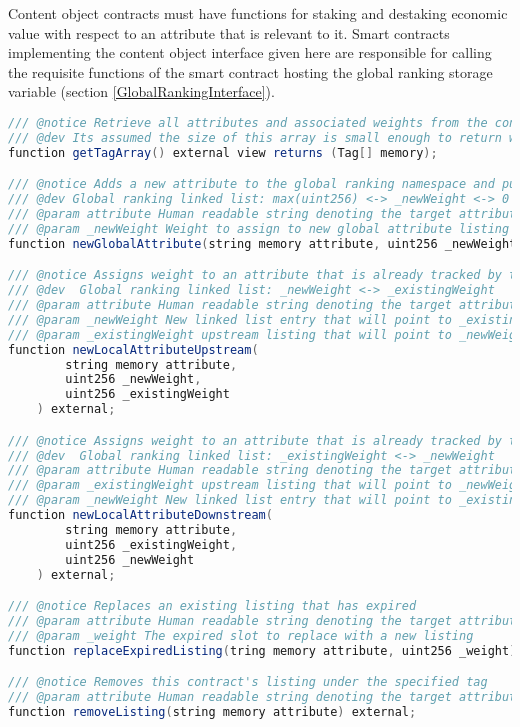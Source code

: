 Content object contracts must have functions for staking and destaking economic value with respect to an attribute that is relevant to it. Smart contracts implementing the content object interface given here are responsible for calling the requisite functions of the smart contract hosting the global ranking storage variable (section \ref{GlobalRankingInterface}). 

\begin{lstlisting}[language=Java, caption=A minimal interface for a content object.]
/// @notice Retrieve all attributes and associated weights from the content object
/// @dev Its assumed the size of this array is small enough to return without pagination
function getTagArray() external view returns (Tag[] memory);

/// @notice Adds a new attribute to the global ranking namespace and pulls stake from the caller account
/// @dev Global ranking linked list: max(uint256) <-> _newWeight <-> 0
/// @param attribute Human readable string denoting the target attribute to stake
/// @param _newWeight Weight to assign to new global attribute listing
function newGlobalAttribute(string memory attribute, uint256 _newWeight) external;

/// @notice Assigns weight to an attribute that is already tracked by the global ranking namespace but hasn't been weighted by this content object yet, pulls stake from the caller account
/// @dev  Global ranking linked list: _newWeight <-> _existingWeight
/// @param attribute Human readable string denoting the target attribute to stake
/// @param _newWeight New linked list entry that will point to _existingWeight listing
/// @param _existingWeight upstream listing that will point to _newWeight
function newLocalAttributeUpstream(
        string memory attribute, 
        uint256 _newWeight, 
        uint256 _existingWeight
    ) external;

/// @notice Assigns weight to an attribute that is already tracked by the global ranking namespace but hasn't been weighted by this content object yet, pulls stake from the caller account
/// @dev  Global ranking linked list: _existingWeight <-> _newWeight
/// @param attribute Human readable string denoting the target attribute to stake
/// @param _existingWeight upstream listing that will point to _newWeight
/// @param _newWeight New linked list entry that will point to _existingWeight listing
function newLocalAttributeDownstream(
        string memory attribute, 
        uint256 _existingWeight, 
        uint256 _newWeight
    ) external;

/// @notice Replaces an existing listing that has expired 
/// @param attribute Human readable string denoting the target attribute to stake
/// @param _weight The expired slot to replace with a new listing
function replaceExpiredListing(tring memory attribute, uint256 _weight) external;

/// @notice Removes this contract's listing under the specified tag
/// @param attribute Human readable string denoting the target attribute to destake
function removeListing(string memory attribute) external;
\end{lstlisting}

